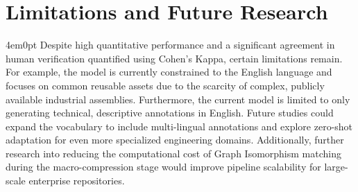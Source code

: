 \section{Limitations and Future Research}
\begin{indentedblock}{4em}{0pt}
	Despite high quantitative performance and a significant agreement in human verification quantified using Cohen's Kappa, certain limitations remain. For example, the model is currently constrained to the English language and focuses on common reusable assets due to the scarcity of complex, publicly available industrial assemblies. Furthermore, the current model is limited to only generating technical, descriptive annotations in English. Future studies could expand the vocabulary to include multi-lingual annotations and explore zero-shot adaptation for even more specialized engineering domains. Additionally, further research into reducing the computational cost of Graph Isomorphism matching during the macro-compression stage would improve pipeline scalability for large-scale enterprise repositories.
\end{indentedblock}

\endgroup